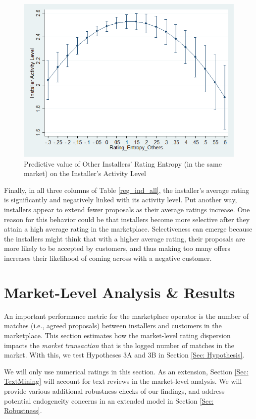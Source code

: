 \documentclass[msom,blindrev]{informs3}
\begin{document}
	\begin{figure}
		\centering
		\includegraphics[width=0.7\linewidth]{marginsplot_entothers.png}
		\caption{Predictive value of Other Installers' Rating Entropy (in the same market) on the Installer's Activity Level}
		\label{fig: marginsplot_ind_ent_others}
	\end{figure}
	
	
	
	
	
	Finally, in all three columns of Table \ref{reg_ind_all}, the installer's average rating is significantly and negatively linked with its activity level. Put another way, installers appear to extend fewer proposals as their average ratings increase. One reason for this behavior could be that  installers become more selective after they attain a high average rating in the marketplace. Selectiveness can emerge because the installers might think that with a higher average rating, their proposals are more likely to be accepted by customers, and thus making too many offers increases their likelihood of coming across with a negative customer.
	
	\section{Market-Level Analysis \& Results} \label{Sec: Market-level}
	
	An important performance metric for the marketplace operator is the number of matches (i.e., agreed proposals) between installers and customers in the marketplace. This section estimates how the market-level rating dispersion impacts the \emph{market transaction} that is the logged number of matches in the market. With this, we test Hypotheses 3A and 3B in Section \ref{Sec: Hypothesis}.
	
	We will only use numerical ratings in this section. As an extension, Section \ref{Sec: TextMining} will account for text reviews in the market-level analysis. We will provide various additional robustness checks of our findings, and address potential endogeneity concerns in an extended model in Section \ref{Sec: Robustness}.
	
\end{document}
